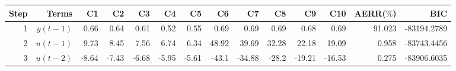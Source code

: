 \begin{tabular}{rrrrrrrrrrrrrr}
Step & Terms & C1 & C2 & C3 & C4 & C5 & C6 & C7 & C8 & C9 & C10 & AERR($\%$) & BIC \\ 
\hline 
1 & $y(t-1)$ & 0.66 & 0.64 & 0.61 & 0.52 & 0.55 & 0.69 & 0.69 & 0.69 & 0.68 & 0.69 & 91.023 & -83194.2789 \\ 
2 & $u(t-1)$ & 9.73 & 8.45 & 7.56 & 6.74 & 6.34 & 48.92 & 39.69 & 32.28 & 22.18 & 19.09 & 0.958 & -83743.4456 \\ 
3 & $u(t-2)$ & -8.64 & -7.43 & -6.68 & -5.95 & -5.61 & -43.1 & -34.88 & -28.2 & -19.21 & -16.53 & 0.275 & -83906.6035 \\ 
\hline 
\end{tabular}